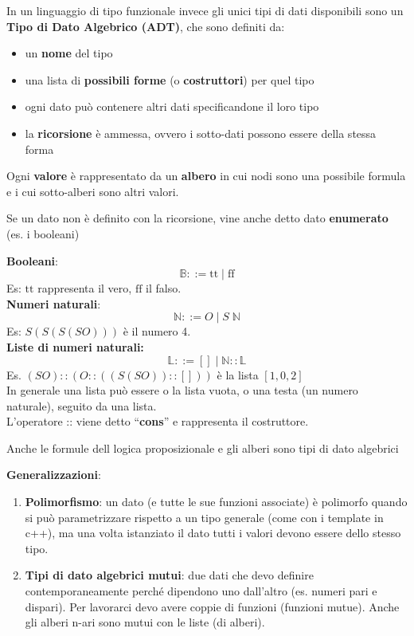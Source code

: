 \documentclass[
  a4paper,
]{article}
\providecommand{\tightlist}{%
  \setlength{\itemsep}{0pt}\setlength{\parskip}{0pt}}
\begin{document}
In un linguaggio di tipo funzionale invece gli unici tipi di dati
disponibili sono un \textbf{Tipo di Dato Algebrico (ADT)}, che sono
definiti da:

\begin{itemize}
\tightlist
\item
  un \textbf{nome} del tipo
\item
  una lista di \textbf{possibili forme} (o \textbf{costruttori}) per
  quel tipo
\item
  ogni dato può contenere altri dati specificandone il loro tipo
\item
  la \textbf{ricorsione} è ammessa, ovvero i sotto-dati possono essere
  della stessa forma
\end{itemize}

Ogni \textbf{valore} è rappresentato da un \textbf{albero} in cui nodi
sono una possibile formula e i cui sotto-alberi sono altri valori.

Se un dato non è definito con la ricorsione, vine anche detto dato
\textbf{enumerato} (es. i booleani)

\begin{examplebox}

\textbf{Booleani}: \[
\mathbb{B} ::= \text{tt} \; | \; \text{ff}
\] Es: \(\text{tt}\) rappresenta il vero, \(\text{ff}\) il falso. \[
\] \textbf{Numeri naturali}: \[
\mathbb{N} ::= O \; | \; S \; \mathbb{N}
\] Es: \(S(S(S(SO)))\) è il numero 4. \[
\] \textbf{Liste di numeri naturali:} \[
\mathbb{L} ::= [] \; | \; \mathbb{N} :: \mathbb{L}
\] Es. \((SO)::(O::((S(SO))::[]))\) è la lista \([1, 0, 2]\)\\
In generale una lista può essere o la lista vuota, o una testa (un
numero naturale), seguito da una lista.\\
L'operatore :: viene detto ``\textbf{cons}'' e rappresenta il
costruttore.

\end{examplebox}

Anche le formule dell logica proposizionale e gli alberi sono tipi di
dato algebrici

\textbf{Generalizzazioni}:

\begin{enumerate}
\def\labelenumi{\arabic{enumi}.}
\tightlist
\item
  \textbf{Polimorfismo}: un dato (e tutte le sue funzioni associate) è
  polimorfo quando si può parametrizzare rispetto a un tipo generale
  (come con i template in c++), ma una volta istanziato il dato tutti i
  valori devono essere dello stesso tipo.
\item
  \textbf{Tipi di dato algebrici mutui}: due dati che devo definire
  contemporaneamente perché dipendono uno dall'altro (es. numeri pari e
  dispari). Per lavorarci devo avere coppie di funzioni (funzioni
  mutue). Anche gli alberi n-ari sono mutui con le liste (di alberi).
\end{enumerate}
\end{document}
